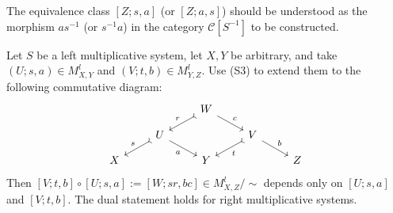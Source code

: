 The equivalence class $[Z;s,a]$ (or $[Z;a,s]$) should be understood as the
morphism $as^{-1}$ (or $s^{-1}a$) in the category $\mathcal{C}[S^{-1}]$ to be
constructed.

\begin{definition-proposition}\label{prop:localized-composition}
	Let $S$ be a left multiplicative system, let $X,Y$ be arbitrary, and take
	$(U;s,a)\in M_{X,Y}^l$ and $(V;t,b)\in M_{Y,Z}^l$. Use (S3) to extend them
	to the following commutative diagram:
	\[\begin{tikzcd}[row sep=small]
		& & W \arrow[rightarrowtail, ld, "r"'] \arrow[rd, "c"] & & \\
		& U \arrow[rightarrowtail, ld, "s"'] \arrow[rd, "a"'] & & V \arrow[rightarrowtail, ld, "t"] \arrow[rd, "b"] & \\
		X & & Y & & Z
	\end{tikzcd}\]
	Then
	$[V;t,b]\circ[U;s,a]:=[W;sr,bc]\in M_{X,Z}^l/\sim$ depends only on
	$[U;s,a]$ and $[V;t,b]$. The dual statement holds for right multiplicative
	systems.
\end{definition-proposition}
